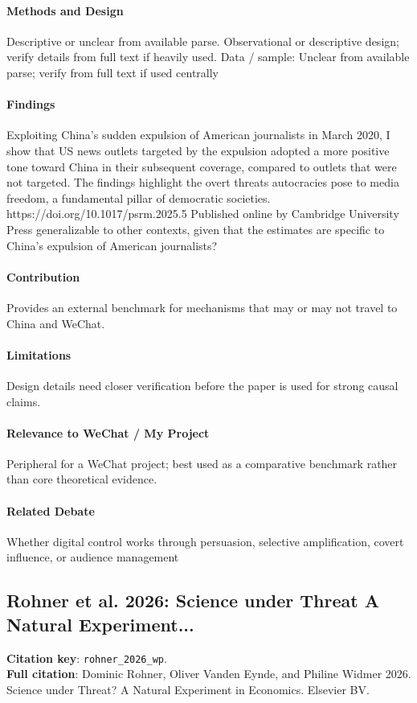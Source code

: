 \documentclass[12pt]{article}
\begin{document}
\paragraph{Methods and Design} Descriptive or unclear from available parse. Observational or descriptive design; verify details from full text if heavily used. Data / sample: Unclear from available parse; verify from full text if used centrally

\paragraph{Findings} Exploiting China's sudden expulsion of American journalists in March 2020, I show that US news outlets targeted by the expulsion adopted a more positive tone toward China in their subsequent coverage, compared to outlets that were not targeted. The findings highlight the overt threats autocracies pose to media freedom, a fundamental pillar of democratic societies. https://doi.org/10.1017/psrm.2025.5 Published online by Cambridge University Press generalizable to other contexts, given that the estimates are specific to China's expulsion of American journalists?

\paragraph{Contribution} Provides an external benchmark for mechanisms that may or may not travel to China and WeChat.

\paragraph{Limitations} Design details need closer verification before the paper is used for strong causal claims.

\paragraph{Relevance to WeChat / My Project} Peripheral for a WeChat project; best used as a comparative benchmark rather than core theoretical evidence.

\paragraph{Related Debate} Whether digital control works through persuasion, selective amplification, covert influence, or audience management


\subsection{Rohner et al. 2026: Science under Threat A Natural Experiment...}
\textbf{Citation key}: \texttt{rohner\_2026\_wp}.\\
\textbf{Full citation}: Dominic Rohner, Oliver Vanden Eynde, and Philine Widmer 2026. Science under Threat? A Natural Experiment in Economics. Elsevier BV.
\end{document}
